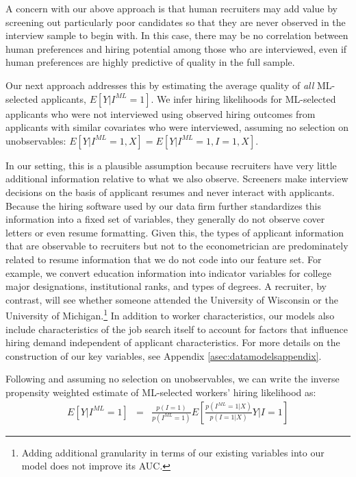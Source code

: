 \documentclass[crop,noquery,editorname,historyrev,nosurname,runningno,sepcount]{RESTUD}
\begin{document}
A concern with our above approach is that human recruiters may add value by screening out particularly poor candidates so that they are never observed in the interview sample to begin with.  In this case, there may be no correlation between human preferences and hiring potential among those who are interviewed, even if human preferences are highly predictive of quality in the full sample.

Our next approach addresses this by estimating the average quality of \textit{all} ML-selected applicants, $E[Y|I^{ML}=1]$. We infer hiring likelihoods for ML-selected applicants who were not interviewed using observed hiring outcomes from applicants with similar covariates who were interviewed, assuming no selection on unobservables: $E[Y|I^{ML}=1, X] =  E[Y|I^{ML}=1, I=1, X]$.  

In our setting, this is a plausible assumption because recruiters have very little additional information relative to what we also observe. Screeners make interview decisions on the basis of applicant resumes and never interact with applicants.  Because the hiring software used by our data firm further standardizes this information into a fixed set of variables, they generally do not observe cover letters or even resume formatting.  Given this, the types of applicant information that are observable to recruiters but not to the econometrician are predominately related to resume information that we do not code into our feature set.  For example, we convert education information into indicator variables for college major designations, institutional ranks, and types of degrees.  A recruiter, by contrast, will see whether someone attended the University of Wisconsin or the University of Michigan.\footnote{Adding additional granularity in terms of our existing variables into our model does not improve its AUC.}  In addition to worker characteristics, our models also include characteristics of the job search itself to account for factors that influence hiring demand independent of applicant characteristics. For more details on the construction of our key variables, see Appendix \ref{asec:datamodelsappendix}.

Following \citet{hirano2003} and assuming no selection on unobservables, we can write the inverse propensity weighted estimate of ML-selected workers' hiring likelihood as:
\begin{eqnarray}
	E[Y|I^{ML}=1] &=& \frac{p(I=1)}{p(I^{ML}=1)}E\left[\frac{p(I^{ML}=1 | X)}{p(I=1|X)}Y|I=1\right] \label{decompeqn}
\end{eqnarray} 
\end{document}
